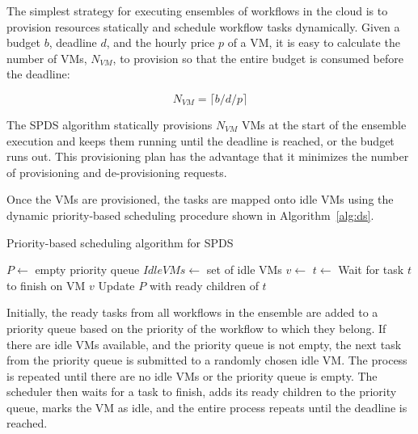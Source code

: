 \documentclass{sig-alternate}
\begin{document}
The simplest strategy for executing ensembles of workflows in the cloud is to
provision resources statically and schedule workflow tasks dynamically. Given a 
budget $b$, deadline $d$, and the hourly price $p$ of a VM, it is easy to calculate
the number of VMs, $N_{VM}$, to provision so that the entire budget is consumed before
the deadline:

\begin{equation}
\label{eq:static-plan}
N_{VM} = \lceil b / d / p \rceil
\end{equation}

The SPDS algorithm statically provisions $N_{VM}$ VMs at the start of the ensemble execution 
and keeps them running until the deadline is reached, or the budget runs out.
This provisioning plan has the advantage that it minimizes the number of provisioning 
and de-provisioning requests.

Once the VMs are provisioned, the tasks are mapped onto idle VMs using the dynamic
priority-based scheduling procedure shown in Algorithm~\ref{alg:ds}.

\begin{algorithm}[tb]
\caption{Priority-based scheduling algorithm for SPDS}
\label{alg:ds}
\begin{algorithmic}[1]
    \State $P\gets$ empty priority queue
	\State $IdleVMs\gets$ set of idle VMs
    	\State {} 
    \EndFor
    		\State $v\gets$ 
    		\State $t\gets$ 
    		\State {}
    	\EndWhile
    	\State Wait for task $t$ to finish on VM $v$
    	\State Update $P$ with ready children of $t$
		\State {}
    \EndWhile
\EndProcedure
\end{algorithmic} 
\end{algorithm}

Initially, the ready tasks from all workflows in the ensemble are added to a 
priority queue based on the priority of the workflow to which they belong. If
there are idle VMs available, and the priority queue is not empty, the next task
from the priority queue is submitted to a randomly chosen idle VM. The process is 
repeated until there are no idle VMs or the priority queue is empty. The scheduler
then waits for a task to finish, adds its ready children to the priority queue,
marks the VM as idle, and the entire process repeats until the deadline is reached.
\end{document}
